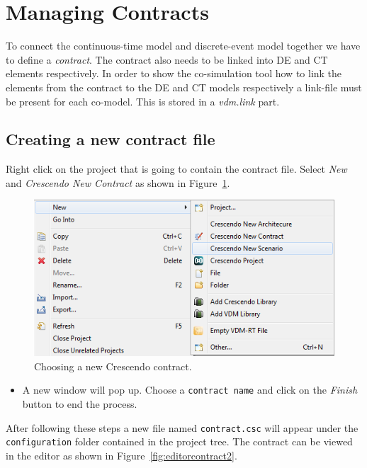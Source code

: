 \documentclass{crescendorepchap}
\begin{document}

\section{Managing Contracts}\label{sec:contract}

To connect the continuous-time model and discrete-event model together
we have to define a \emph{contract}. The contract also needs to be linked
into DE and CT elements respectively.
In order to show the co-simulation tool how to link the elements from
the contract to the DE and CT models respectively a link-file must be
present for each co-model. This is stored in a \emph{vdm.link} part.

\subsection{Creating a new contract file}

Right click on the project that is going to contain the contract file.
Select \emph{New} and \emph{Crescendo New Contract} as shown in Figure~\ref{fig:newcontract}.

\begin{figure}[htbp]
\centering
\includegraphics[width=.6\textwidth]{images/DestecsNewContract.png}
\caption{Choosing a new Crescendo contract.\label{fig:newcontract}}
\end{figure}

\begin{itemize}
\item
  A new window will pop up. Choose a \texttt{contract name} and click on
  the \emph{Finish} button to end the process.
\end{itemize}

After following these steps a new file named \texttt{contract.csc} will
appear under the \\ \texttt{configuration} folder contained in the project
tree. The contract can be viewed in the editor as shown in Figure~\ref{fig:editorcontract2}.
\end{document}
